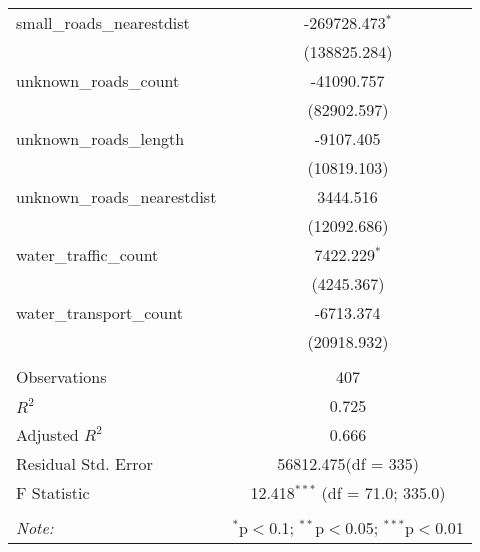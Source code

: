 \begin{table}[!htbp]
\begin{tabular}{@{\extracolsep{5pt}}lc}
 small_roads_nearestdist & -269728.473$^{*}$ \\
  & (138825.284) \\
 unknown_roads_count & -41090.757$^{}$ \\
  & (82902.597) \\
 unknown_roads_length & -9107.405$^{}$ \\
  & (10819.103) \\
 unknown_roads_nearestdist & 3444.516$^{}$ \\
  & (12092.686) \\
 water_traffic_count & 7422.229$^{*}$ \\
  & (4245.367) \\
 water_transport_count & -6713.374$^{}$ \\
  & (20918.932) \\
\hline \\[-1.8ex]
 Observations & 407 \\
 $R^2$ & 0.725 \\
 Adjusted $R^2$ & 0.666 \\
 Residual Std. Error & 56812.475(df = 335)  \\
 F Statistic & 12.418$^{***}$ (df = 71.0; 335.0) \\
\hline
\hline \\[-1.8ex]
\textit{Note:} & \multicolumn{1}{r}{$^{*}$p$<$0.1; $^{**}$p$<$0.05; $^{***}$p$<$0.01} \\
\end{tabular}
\end{table}